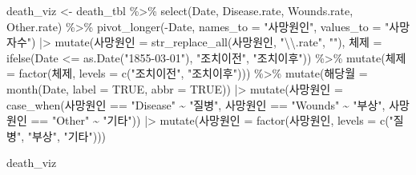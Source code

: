 \documentclass[
  letterpaper,
  chapter,a4paper,showtrims,openright,hidelinks]{oblivoir}
\newenvironment{Shaded}{\begin{snugshade}}{\end{snugshade}}
\newcommand{\AttributeTok}[1]{\textcolor[rgb]{0.40,0.45,0.13}{#1}}
\newcommand{\ConstantTok}[1]{\textcolor[rgb]{0.56,0.35,0.01}{#1}}
\newcommand{\FunctionTok}[1]{\textcolor[rgb]{0.28,0.35,0.67}{#1}}
\newcommand{\NormalTok}[1]{\textcolor[rgb]{0.00,0.23,0.31}{#1}}
\newcommand{\OtherTok}[1]{\textcolor[rgb]{0.00,0.23,0.31}{#1}}
\newcommand{\SpecialCharTok}[1]{\textcolor[rgb]{0.37,0.37,0.37}{#1}}
\newcommand{\StringTok}[1]{\textcolor[rgb]{0.13,0.47,0.30}{#1}}
\begin{document}
\begin{Shaded}
\begin{Highlighting}[]
\NormalTok{death\_viz }\OtherTok{\textless{}{-}}\NormalTok{ death\_tbl }\SpecialCharTok{\%\textgreater{}\%} 
  \FunctionTok{select}\NormalTok{(Date, Disease.rate, Wounds.rate, Other.rate) }\SpecialCharTok{\%\textgreater{}\%} 
  \FunctionTok{pivot\_longer}\NormalTok{(}\SpecialCharTok{{-}}\NormalTok{Date, }\AttributeTok{names\_to =} \StringTok{"사망원인"}\NormalTok{, }\AttributeTok{values\_to =} \StringTok{"사망자수"}\NormalTok{) }\SpecialCharTok{|\textgreater{}} 
  \FunctionTok{mutate}\NormalTok{(사망원인 }\OtherTok{=} \FunctionTok{str\_replace\_all}\NormalTok{(사망원인, }\StringTok{"}\SpecialCharTok{\textbackslash{}\textbackslash{}}\StringTok{.rate"}\NormalTok{, }\StringTok{""}\NormalTok{), }
\NormalTok{         체제 }\OtherTok{=} \FunctionTok{ifelse}\NormalTok{(Date }\SpecialCharTok{\textless{}=} \FunctionTok{as.Date}\NormalTok{(}\StringTok{"1855{-}03{-}01"}\NormalTok{), }\StringTok{"조치이전"}\NormalTok{, }\StringTok{"조치이후"}\NormalTok{)) }\SpecialCharTok{\%\textgreater{}\%} 
  \FunctionTok{mutate}\NormalTok{(체제 }\OtherTok{=} \FunctionTok{factor}\NormalTok{(체제, }\AttributeTok{levels =} \FunctionTok{c}\NormalTok{(}\StringTok{"조치이전"}\NormalTok{, }\StringTok{"조치이후"}\NormalTok{))) }\SpecialCharTok{\%\textgreater{}\%}  
  \FunctionTok{mutate}\NormalTok{(해당월 }\OtherTok{=} \FunctionTok{month}\NormalTok{(Date, }\AttributeTok{label =} \ConstantTok{TRUE}\NormalTok{, }\AttributeTok{abbr =} \ConstantTok{TRUE}\NormalTok{)) }\SpecialCharTok{|\textgreater{}} 
  \FunctionTok{mutate}\NormalTok{(사망원인 }\OtherTok{=} \FunctionTok{case\_when}\NormalTok{(사망원인 }\SpecialCharTok{==} \StringTok{"Disease"} \SpecialCharTok{\textasciitilde{}} \StringTok{"질병"}\NormalTok{,}
\NormalTok{                              사망원인 }\SpecialCharTok{==} \StringTok{"Wounds"} \SpecialCharTok{\textasciitilde{}} \StringTok{"부상"}\NormalTok{,}
\NormalTok{                              사망원인 }\SpecialCharTok{==} \StringTok{"Other"} \SpecialCharTok{\textasciitilde{}} \StringTok{"기타"}\NormalTok{)) }\SpecialCharTok{|\textgreater{}} 
  \FunctionTok{mutate}\NormalTok{(사망원인 }\OtherTok{=} \FunctionTok{factor}\NormalTok{(사망원인, }\AttributeTok{levels =} \FunctionTok{c}\NormalTok{(}\StringTok{"질병"}\NormalTok{, }\StringTok{"부상"}\NormalTok{, }\StringTok{"기타"}\NormalTok{)))}

\NormalTok{death\_viz}
\end{Highlighting}
\end{Shaded}
\end{document}

